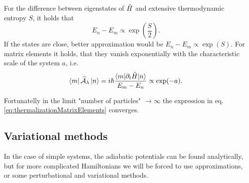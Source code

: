 \begin{hypot}
  For the difference between eigenstates of $\hat{H}$ and extensive thermodynamic entropy $S$, it holds that
    \begin{equation}
    E_n-E_m\propto \exp\left(\frac{S}{2}\right).
  \end{equation}
  If the states are close, better approximation would be $E_n-E_m\propto \exp(S)$. For matrix elements it holds, that they vanish exponentially with the characteristic scale of the system $a$, i.e.
  \begin{equation}
    \bra{m}\mathcal{\widehat{A}}_\lambda\ket{n} = i\hbar\frac{\braket{m|\partial_t \hat{H}|n}}{E_m-E_n} \propto \exp(-a).
    \label{eq:thermalizationMatrixElements}
\end{equation}
\end{hypot}
Fortunatelly in the limit "number of particles" $\rightarrow \infty$ the expression in eq. \ref{eq:thermalizationMatrixElements} converges.



\subsection{Variational methods}
In the case of simple systems, the adiabatic potentials can be found analytically, but for more complicated Hamiltonians we will be forced to use approximations, or some perturbational and variational methods.
